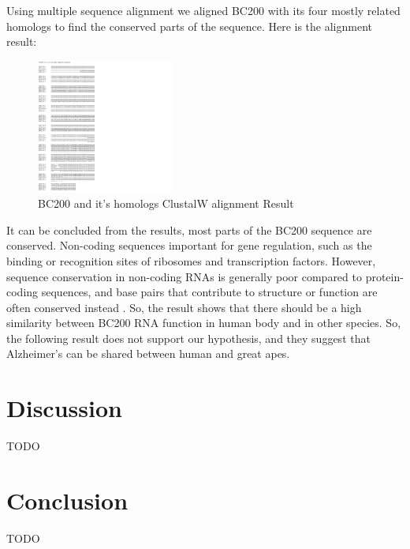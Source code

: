 \documentclass[conference, 11pt]{IEEEtran}
\begin{document}
Using multiple sequence alignment we aligned BC200 with its four mostly related homologs to find the conserved parts of the sequence.
Here is the alignment result:

\begin{figure}[h]
  \centering
  \includegraphics[width=0.4\textwidth]{figs/alignment.png}
  \caption{BC200 and it's homologs ClustalW alignment Result}
  \label{fig:alignment result}
\end{figure}

It can be concluded from the results, most parts of the BC200 sequence are conserved. 
Non-coding sequences important for gene regulation, such as the binding or recognition sites of ribosomes and transcription factors. 
However, sequence conservation in non-coding RNAs is generally poor compared to protein-coding sequences, and base pairs that contribute to structure or function are often conserved instead \cite{johnsson2014evolutionary}. 
So, the result shows that there should be a high similarity between BC200 RNA function in human body and in other species. 
So, the following result does not support our hypothesis, and they suggest that Alzheimer’s can be shared between human and great apes.

\section{Discussion}\label{sec:discussion}
TODO

\section{Conclusion}\label{sec:conclusion}
TODO



\end{document}
